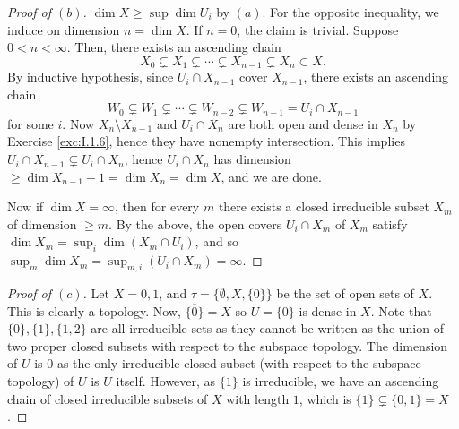 \documentclass[10pt]{article}
\theoremstyle{definition}
\theoremstyle{remark}
\numberwithin{equation}{section}
\numberwithin{figure}{subsubsection}
\begin{document}
\begin{proof}[Proof of $(b)$]
  $\dim X \ge \sup \dim U_i$ by $(a)$.
  For the opposite inequality, we induce on dimension $n = \dim X$.
  If $n = 0$, the claim is trivial.
  Suppose $0 < n < \infty$. Then, there exists an ascending chain
  \begin{equation*}
    X_0 \subsetneq X_1 \subsetneq\cdots \subsetneq X_{n-1} \subsetneq X_n
    \subset X.
  \end{equation*}
  By inductive hypothesis, since $U_i \cap X_{n-1}$ cover $X_{n-1}$, there
  exists an ascending chain
  \begin{equation*}
    W_0 \subsetneq W_1 \subsetneq \cdots \subsetneq W_{n-2} \subsetneq W_{n-1}
    = U_i \cap X_{n-1}
  \end{equation*}
  for some $i$. Now $X_n \setminus X_{n-1}$ and $U_i \cap X_n$ are both open and
  dense in $X_n$ by Exercise \ref{exc:I.1.6}, hence they have nonempty
  intersection.
  This implies $U_i \cap X_{n-1} \subsetneq U_i \cap X_n$, hence $U_i \cap X_n$
  has dimension $\ge \dim X_{n-1} + 1 = \dim X_n = \dim X$, and we are done.
  \par Now if $\dim X = \infty$, then for every $m$ there exists a closed
  irreducible subset $X_m$ of dimension $\ge m$. By the above, the open covers $U_i
  \cap X_m$ of $X_m$ satisfy $\dim X_m = \sup_i\dim (X_m \cap U_i)$, and so
  $\sup_m \dim X_m = \sup_{m,i}(U_i \cap X_m) = \infty$.
\end{proof}
\begin{proof}[Proof of $(c)$]
	Let $X = {0,1}$, and $\tau = \{ \emptyset, X, \{0\}\}$ be the set of open sets of $X$.
  This is clearly a topology. 
	Now, $\overline{\{0\}} = X$ so $U = \{0\}$ is dense in $X$.
  Note that $\{0\},\{1\},\{1,2\}$ are all irreducible sets as they cannot be
  written as the union of two proper closed subsets with respect to the subspace
  topology.
	The dimension of $U$ is $0$ as the only irreducible closed subset (with respect
  to the subspace topology) of $U$ is $U$ itself. However, as $\{1\}$ is
  irreducible, we have an ascending chain of closed irreducible subsets of
  $X$ with length $1$, which is $\{1\} \subsetneq \{0,1\} = X$.  
\end{proof}
\end{document}
